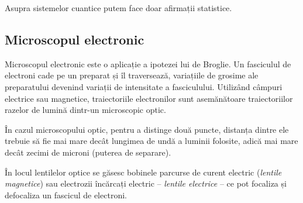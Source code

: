 Asupra sistemelor cuantice putem face doar afirmații statistice.

\subsection{Microscopul electronic}

Microscopul electronic este o aplicație a ipotezei lui de Broglie. Un
fasciculul de electroni cade pe un preparat și îl traversează, variațiile de
grosime ale preparatului devenind variații de intensitate a fasciculului.
Utilizând câmpuri electrice sau magnetice, traiectoriile electronilor sunt
asemănătoare traiectoriilor razelor de lumină dintr-un microscopic optic.

În cazul microscopului optic, pentru a distinge două puncte, distanța dintre
ele trebuie să fie mai mare decât lungimea de undă a luminii folosite, adică
mai mare decât zecimi de microni (puterea de separare).

În locul lentilelor optice se găsesc bobinele parcurse de curent electric
(\emph{lentile magnetice}) sau electrozii încărcați electric
-- \emph{lentile electrice} -- ce pot focaliza și defocaliza un fascicul de
electroni.

\parbreak

